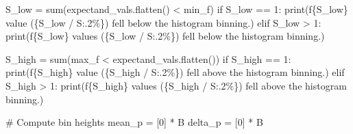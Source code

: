 \documentclass[
  letterpaper,
  DIV=11,
  numbers=noendperiod]{scrartcl}
\newenvironment{Shaded}{\begin{snugshade}}{\end{snugshade}}
\newcommand{\BuiltInTok}[1]{\textcolor[rgb]{0.00,0.23,0.31}{#1}}
\newcommand{\CommentTok}[1]{\textcolor[rgb]{0.37,0.37,0.37}{#1}}
\newcommand{\ControlFlowTok}[1]{\textcolor[rgb]{0.00,0.23,0.31}{#1}}
\newcommand{\DecValTok}[1]{\textcolor[rgb]{0.68,0.00,0.00}{#1}}
\newcommand{\NormalTok}[1]{\textcolor[rgb]{0.00,0.23,0.31}{#1}}
\newcommand{\OperatorTok}[1]{\textcolor[rgb]{0.37,0.37,0.37}{#1}}
\newcommand{\SpecialCharTok}[1]{\textcolor[rgb]{0.37,0.37,0.37}{#1}}
\newcommand{\SpecialStringTok}[1]{\textcolor[rgb]{0.13,0.47,0.30}{#1}}
\newcommand{\StringTok}[1]{\textcolor[rgb]{0.13,0.47,0.30}{#1}}
\begin{document}
\begin{Shaded}
\begin{Highlighting}[]
\NormalTok{  S\_low }\OperatorTok{=} \BuiltInTok{sum}\NormalTok{(expectand\_vals.flatten() }\OperatorTok{\textless{}}\NormalTok{ min\_f)}
  \ControlFlowTok{if}\NormalTok{ S\_low }\OperatorTok{==} \DecValTok{1}\NormalTok{:}
    \BuiltInTok{print}\NormalTok{(}\SpecialStringTok{f\textquotesingle{}}\SpecialCharTok{\{}\NormalTok{S\_low}\SpecialCharTok{\}}\SpecialStringTok{ value (}\SpecialCharTok{\{}\NormalTok{S\_low }\OperatorTok{/}\NormalTok{ S}\SpecialCharTok{:.2\%\}}\SpecialStringTok{)\textquotesingle{}}
           \StringTok{\textquotesingle{} fell below the histogram binning.\textquotesingle{}}\NormalTok{)}
  \ControlFlowTok{elif}\NormalTok{ S\_low }\OperatorTok{\textgreater{}} \DecValTok{1}\NormalTok{:}
    \BuiltInTok{print}\NormalTok{(}\SpecialStringTok{f\textquotesingle{}}\SpecialCharTok{\{}\NormalTok{S\_low}\SpecialCharTok{\}}\SpecialStringTok{ values (}\SpecialCharTok{\{}\NormalTok{S\_low }\OperatorTok{/}\NormalTok{ S}\SpecialCharTok{:.2\%\}}\SpecialStringTok{)\textquotesingle{}}
           \StringTok{\textquotesingle{} fell below the histogram binning.\textquotesingle{}}\NormalTok{)}

\NormalTok{  S\_high }\OperatorTok{=} \BuiltInTok{sum}\NormalTok{(max\_f }\OperatorTok{\textless{}}\NormalTok{ expectand\_vals.flatten())}
  \ControlFlowTok{if}\NormalTok{ S\_high }\OperatorTok{==} \DecValTok{1}\NormalTok{:}
    \BuiltInTok{print}\NormalTok{(}\SpecialStringTok{f\textquotesingle{}}\SpecialCharTok{\{}\NormalTok{S\_high}\SpecialCharTok{\}}\SpecialStringTok{ value (}\SpecialCharTok{\{}\NormalTok{S\_high }\OperatorTok{/}\NormalTok{ S}\SpecialCharTok{:.2\%\}}\SpecialStringTok{)\textquotesingle{}}
           \StringTok{\textquotesingle{} fell above the histogram binning.\textquotesingle{}}\NormalTok{)}
  \ControlFlowTok{elif}\NormalTok{ S\_high }\OperatorTok{\textgreater{}} \DecValTok{1}\NormalTok{:}
    \BuiltInTok{print}\NormalTok{(}\SpecialStringTok{f\textquotesingle{}}\SpecialCharTok{\{}\NormalTok{S\_high}\SpecialCharTok{\}}\SpecialStringTok{ values (}\SpecialCharTok{\{}\NormalTok{S\_high }\OperatorTok{/}\NormalTok{ S}\SpecialCharTok{:.2\%\}}\SpecialStringTok{)\textquotesingle{}}
           \StringTok{\textquotesingle{} fell above the histogram binning.\textquotesingle{}}\NormalTok{)}

  \CommentTok{\# Compute bin heights}
\NormalTok{  mean\_p }\OperatorTok{=}\NormalTok{ [}\DecValTok{0}\NormalTok{] }\OperatorTok{*}\NormalTok{ B}
\NormalTok{  delta\_p }\OperatorTok{=}\NormalTok{ [}\DecValTok{0}\NormalTok{] }\OperatorTok{*}\NormalTok{ B}
  

\end{Highlighting}
\end{Shaded}
\end{document}
